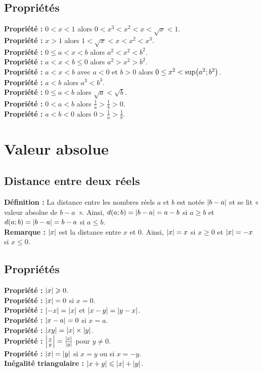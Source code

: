 \documentclass[a4paper,titlepage]{article}
\let\oldsection\section
\renewcommand\section{\clearpage\oldsection}
\let\oldleft\left
\renewcommand{\left}{\mathopen{}\mathclose\bgroup\oldleft}
\let\oldright\right
\renewcommand{\right}{\aftergroup\egroup\oldright}
\begin{document}
    \subsection{Propriétés}
        \textbf{Propriété :} $0<x<1$ alors $0<x^{3}<x^{2}<x<\sqrt{x}<1$.
        \\
        \textbf{Propriété :} $x>1$ alors $1<\sqrt{x}<x<x^{2}<x^{3}$.
        \\
        \textbf{Propriété :} $0\leqslant a<x<b$ alors $a^{2}<x^{2}<b^{2}$.
        \\
        \textbf{Propriété :} $a<x<b\leqslant 0$ alors $a^{2}>x^{2}>b^{2}$.
        \\
        \textbf{Propriété :} $a<x<b$ avec $a<0$ et $b>0$ alors $0\leq x^{2}<\sup\left(a^{2};b^{2}\right)$.
        \\
        \textbf{Propriété :} $a<b$ alors $a^{3}<b^{3}$.
        \\
        \textbf{Propriété :} $0\leqslant a<b$ alors $\sqrt{a}<\sqrt{b}$.
        \\
        \textbf{Propriété :} $0<a<b$ alors $\frac{1}{a}>\frac{1}{b}>0$.
        \\
        \textbf{Propriété :} $a<b<0$ alors $0>\frac{1}{a}>\frac{1}{b}$.
\section{Valeur absolue}
    \subsection{Distance entre deux réels}
        \textbf{Définition :} La distance entre les nombres réels $a$ et $b$ est notée $\left|b-a\right|$ et se lit « valeur absolue de $b-a$~». Ainsi, $d(a;b)=\left|b-a\right|=a-b$ si $a\geqslant b$ et $d(a;b)=\left|b-a\right|=b-a$ si $a\leqslant b$.
        \\
        \textbf{Remarque :} $\left|x\right|$ est la distance entre $x$ et $0$. Ainsi, $\left|x\right|=x$ si $x\geqslant 0$ et $\left|x\right|=-x$ si $x\leqslant 0$.
    \subsection{Propriétés}
        \textbf{Propriété :} $\left|x\right|\geqslant 0$.
        \\
        \textbf{Propriété :} $\left|x\right|=0$ si $x=0$.
        \\
        \textbf{Propriété :} $\left|-x\right|=\left|x\right|$ et $\left|x-y\right|=\left|y-x\right|$.
        \\
        \textbf{Propriété :} $\left|x-a\right|=0$ si $x=a$.
        \\
        \textbf{Propriété :} $\left|xy\right|=\left|x\right|\times\left|y\right|$.
        \\
        \textbf{Propriété :} $\left|\frac{x}{y}\right|=\frac{\left|x\right|}{\left|y\right|}$ pour $y\neq 0$.
        \\
        \textbf{Propriété :} $\left|x\right|=\left|y\right|$ si $x=y$ ou si $x=-y$.
        \\
        \textbf{Inégalité triangulaire :} $\left|x+y\right|\leqslant \left|x\right|+\left|y\right|$.
\end{document}
